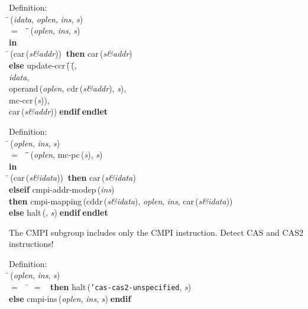 \begin{tabbing}{\sc Definition}: \\  
\=\,({\it{idata\/}}, {\it{oplen\/}}, {\it{ins\/}}, {\it{s\/}}) \\ 
$=$$\;\;\;\;$\=\=\,({\it{oplen\/}}, {\it{ins\/}}, {\it{s\/}})\- \\ 
{\bf in} \\ 
\=\,({\rm{car}}\,({\it{s\&addr\/}}))$\;\;${\bf then }{\rm{car}}\,({\it{s\&addr\/}}) \\ 
{\bf else }{\rm{update-ccr}}\,(\=\,(\=, \\ 
{\it{idata\/}}, \\ 
{\rm{operand}}\,({\it{oplen\/}}, {\rm{cdr}}\,({\it{s\&addr\/}}), {\it{s\/}}), \\ 
{\rm{mc-ccr}}\,({\it{s\/}}))\-, \\ 
{\rm{car}}\,({\it{s\&addr\/}}))\-$\;${\bf  endif}\-$\;${\bf  endlet}\-\-
\end{tabbing}
          
\begin{tabbing}{\sc Definition}: \\  
\=\,({\it{oplen\/}}, {\it{ins\/}}, {\it{s\/}}) \\ 
$=$$\;\;\;\;$\=\=\,({\it{oplen\/}}, {\rm{mc-pc}}\,({\it{s\/}}), {\it{s\/}})\- \\ 
{\bf in} \\ 
\=\,({\rm{car}}\,({\it{s\&idata\/}}))$\;\;${\bf then }{\rm{car}}\,({\it{s\&idata\/}}) \\ 
{\bf elseif }{\rm{cmpi-addr-modep}}\,({\it{ins\/}}) \\ 
{\bf then }{\rm{cmpi-mapping}}\,({\rm{cddr}}\,({\it{s\&idata\/}}), {\it{oplen\/}}, {\it{ins\/}}, {\rm{car}}\,({\it{s\&idata\/}})) \\ 
{\bf else }{\rm{halt}}\,({}, {\it{s\/}})$\;${\bf  endif}\-$\;${\bf  endlet}\-\-
\end{tabbing}

 The CMPI subgroup includes only the CMPI instruction.
 Detect CAS and CAS2 instructions!
\begin{tabbing}{\sc Definition}: \\  
\=\,({\it{oplen\/}}, {\it{ins\/}}, {\it{s\/}}) \\ 
$=$$\;\;\;\;$\= $=$ {}$\;\;${\bf then }{\rm{halt}}\,({\tt{'}}{\tt{cas-cas2-unspecified}}, {\it{s\/}}) \\ 
{\bf else }{\rm{cmpi-ins}}\,({\it{oplen\/}}, {\it{ins\/}}, {\it{s\/}})$\;${\bf  endif}\-\-
\end{tabbing}

